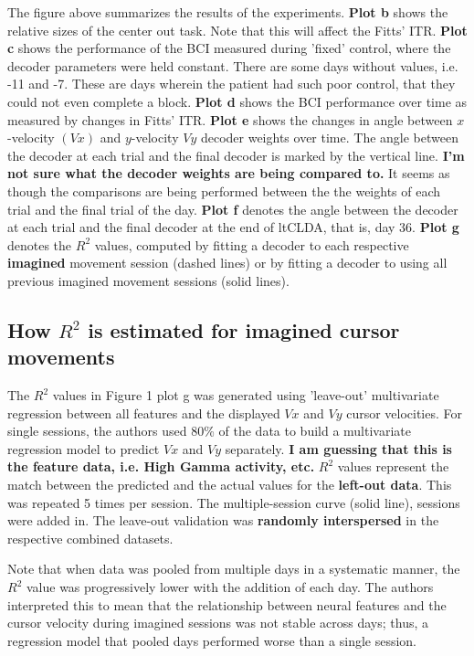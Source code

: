 \documentclass[11pt, a4paper, openany]{report}
\theoremstyle{definition}
\theoremstyle{remark}
\begin{document}
The figure above summarizes the results of the experiments. \textbf{Plot b} shows the relative sizes of the center out task. Note that this will affect the Fitts' ITR. \textbf{Plot c} shows the performance of the BCI measured during 'fixed' control, where the decoder parameters were held constant. There are some days without values, i.e. -11 and -7. These are days wherein the patient had such poor control, that they could not even complete a block. 
\textbf{Plot d} shows the BCI performance over time as measured by changes in Fitts' ITR. \textbf{Plot e} shows the changes in angle between \( x \)-velocity \( (Vx) \) and \( y \)-velocity \( Vy \) decoder weights over time. The angle between the decoder at each trial and the final decoder is marked by the vertical line. \textbf{I'm not sure what the decoder weights are being compared to.} It seems as though the comparisons are being performed between
the the weights of each trial and the final trial of the day. \textbf{Plot f} denotes the angle between the decoder at each trial and the final decoder at the end of ltCLDA, that is, day 36. \textbf{Plot g} denotes the \( R^{2} \) values, computed by fitting a decoder to each respective \textbf{imagined} movement session (dashed lines) or by fitting a decoder to using all previous imagined movement sessions (solid lines). 

\subsection{How \( R^{2} \) is estimated for imagined cursor movements }
The \( R^{2} \) values in Figure 1 plot g was generated using 'leave-out' multivariate regression between all features and the displayed \( Vx \) and \( Vy \) cursor velocities. 
For single sessions, the authors used 80\% of the data to build a multivariate regression model to predict \( Vx \) and \( Vy \) separately. \textbf{I am guessing that this is the feature data, i.e. High Gamma activity, etc.} \( R^{2} \) values represent the match between the predicted and the actual values for the \textbf{left-out data}. This was repeated 5 times per session. The multiple-session curve (solid line), sessions were added in. The leave-out validation was \textbf{randomly interspersed} in the respective combined datasets.

Note that when data was pooled from multiple days in a systematic manner, the \( R^{2} \) value was progressively lower with the addition of each day. The authors interpreted this to mean that the relationship between neural features and the cursor velocity during imagined sessions was not stable across days; thus, a regression model that pooled days performed worse than a single session.
\end{document}
